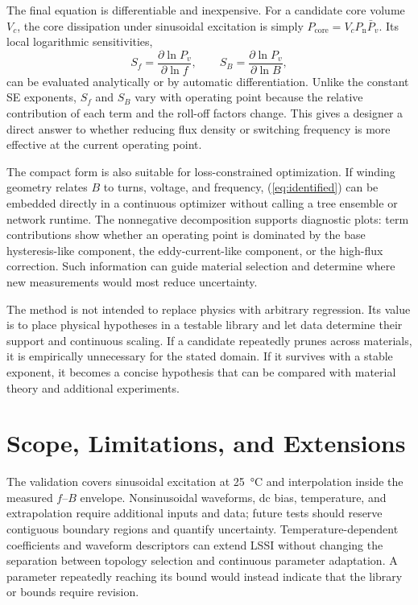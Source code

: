 \documentclass[lettersize,journal]{IEEEtran}
\newcommand{\Pbar}{\bar{P}_{v}}
\begin{document}
The final equation is differentiable and inexpensive. For a candidate core volume $V_c$, the core dissipation under sinusoidal excitation is simply $P_{\mathrm{core}}=V_cP_{\mathrm{n}}\Pbar$. Its local logarithmic sensitivities,
\begin{equation}
 S_f=\frac{\partial\ln P_v}{\partial\ln f},\qquad
 S_B=\frac{\partial\ln P_v}{\partial\ln B},
 \label{eq:sensitivity}
\end{equation}
can be evaluated analytically or by automatic differentiation. Unlike the constant SE exponents, $S_f$ and $S_B$ vary with operating point because the relative contribution of each term and the roll-off factors change. This gives a designer a direct answer to whether reducing flux density or switching frequency is more effective at the current operating point.

The compact form is also suitable for loss-constrained optimization. If winding geometry relates $B$ to turns, voltage, and frequency, (\ref{eq:identified}) can be embedded directly in a continuous optimizer without calling a tree ensemble or network runtime. The nonnegative decomposition supports diagnostic plots: term contributions show whether an operating point is dominated by the base hysteresis-like component, the eddy-current-like component, or the high-flux correction. Such information can guide material selection and determine where new measurements would most reduce uncertainty.

The method is not intended to replace physics with arbitrary regression. Its value is to place physical hypotheses in a testable library and let data determine their support and continuous scaling. If a candidate repeatedly prunes across materials, it is empirically unnecessary for the stated domain. If it survives with a stable exponent, it becomes a concise hypothesis that can be compared with material theory and additional experiments.

\section{Scope, Limitations, and Extensions}

The validation covers sinusoidal excitation at \SI{25}{\degreeCelsius} and interpolation inside the measured $f$--$B$ envelope. Nonsinusoidal waveforms, dc bias, temperature, and extrapolation require additional inputs and data; future tests should reserve contiguous boundary regions and quantify uncertainty. Temperature-dependent coefficients and waveform descriptors can extend LSSI without changing the separation between topology selection and continuous parameter adaptation. A parameter repeatedly reaching its bound would instead indicate that the library or bounds require revision.
\end{document}
